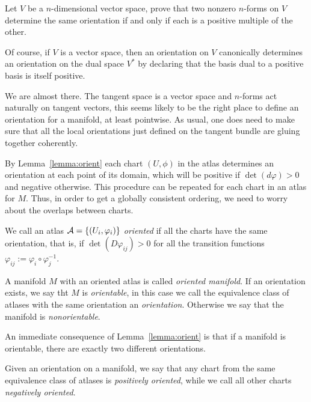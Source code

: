 \begin{exercise}
  Let $V$ be a $n$-dimensional vector space, prove that two nonzero $n$-forms on $V$ determine the same orientation if and only if each is a positive multiple of the other.
\end{exercise}

\begin{remark}
  Of course, if $V$ is a vector space, then an orientation on $V$ canonically determines an orientation on the dual space $V^*$ by declaring that the basis dual to a positive basis is itself positive.
\end{remark}

We are almost there.
The tangent space is a vector space and $n$-forms act naturally on tangent vectors, this seems likely to be the right place to define an orientation for a manifold, at least pointwise.
As usual, one does need to make sure that all the local orientations just defined on the tangent bundle are gluing together coherently.

\begin{remark}
  By Lemma~\ref{lemma:orient} each chart $(U, \phi)$ in the atlas determines an orientation at each point of its domain, which will be positive if $\det(d\varphi)>0$ and negative otherwise.
  This procedure can be repeated for each chart in an atlas for $M$.
  Thus, in order to get a globally consistent ordering, we need to worry about the overlaps between charts.
\end{remark}

\begin{definition}
  We call an atlas $\mathcal{A} = \{(U_i,\varphi_i)\}$ \emph{oriented} if all the charts have the same orientation, that is, if $\det(D\varphi_{ij}) > 0$ for all the transition functions $\varphi_{ij} := \varphi_i\circ\varphi_j^{-1}$.

  A manifold $M$ with an oriented atlas is called \emph{oriented manifold}.
  If an orientation exists, we say tht $M$ is \emph{orientable}, in this case we call the equivalence class of atlases with the same orientation an \emph{orientation}.
  Otherwise we say that the manifold is \emph{nonorientable}.
\end{definition}

An immediate consequence of Lemma~\ref{lemma:orient} is that if a manifold is orientable, there are exactly two different orientations.

\begin{definition}
  Given an orientation on a manifold, we say that any chart from the same equivalence class of atlases is \emph{positively oriented}, while we call all other charts \emph{negatively oriented}.
\end{definition}


